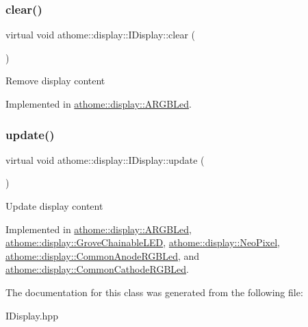 \subsubsection{\texorpdfstring{clear()}{clear()}}
{\footnotesize\ttfamily virtual void athome\+::display\+::\+I\+Display\+::clear (\begin{DoxyParamCaption}{ }\end{DoxyParamCaption})\hspace{0.3cm}{\ttfamily [pure virtual]}}

Remove display content 

Implemented in \mbox{\hyperlink{classathome_1_1display_1_1_a_r_g_b_led_a9753e3a23ea5cb6b0a41079bc6128766}{athome\+::display\+::\+A\+R\+G\+B\+Led}}.

\mbox{\label{classathome_1_1display_1_1_i_display_a4ba7bd5d46f88578f1c846f4f5f3c5d1}} 
\subsubsection{\texorpdfstring{update()}{update()}}
{\footnotesize\ttfamily virtual void athome\+::display\+::\+I\+Display\+::update (\begin{DoxyParamCaption}{ }\end{DoxyParamCaption})\hspace{0.3cm}{\ttfamily [pure virtual]}}

Update display content 

Implemented in \mbox{\hyperlink{classathome_1_1display_1_1_a_r_g_b_led_a725ceca0c01735daa9c95148baf075ab}{athome\+::display\+::\+A\+R\+G\+B\+Led}}, \mbox{\hyperlink{classathome_1_1display_1_1_grove_chainable_l_e_d_a05a4a1381396b7fc11a24993865d8226}{athome\+::display\+::\+Grove\+Chainable\+L\+ED}}, \mbox{\hyperlink{classathome_1_1display_1_1_neo_pixel_a272bca4da78dff7dc02bcd023665e013}{athome\+::display\+::\+Neo\+Pixel}}, \mbox{\hyperlink{classathome_1_1display_1_1_common_anode_r_g_b_led_ab7daf7dcc6ac1e3fcab202cae484b237}{athome\+::display\+::\+Common\+Anode\+R\+G\+B\+Led}}, and \mbox{\hyperlink{classathome_1_1display_1_1_common_cathode_r_g_b_led_ab78ab6aef619d8e0941dd11d4cfbb545}{athome\+::display\+::\+Common\+Cathode\+R\+G\+B\+Led}}.



The documentation for this class was generated from the following file\+:\begin{DoxyCompactItemize}
\item 
I\+Display.\+hpp\end{DoxyCompactItemize}
